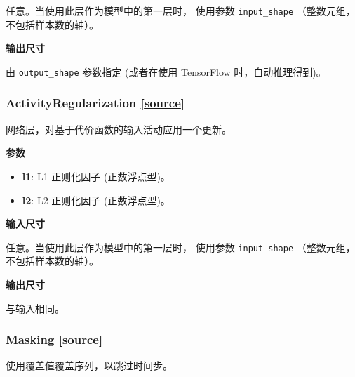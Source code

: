任意。当使用此层作为模型中的第一层时， 使用参数 \texttt{input\_shape}
（整数元组，不包括样本数的轴）。

\textbf{输出尺寸}

由 \texttt{output\_shape} 参数指定 (或者在使用 TensorFlow
时，自动推理得到)。


\subsubsection{ActivityRegularization {\href{https://github.com/keras-team/keras/blob/master/keras/layers/core.py\#L886}{{[}source{]}}}}

\begin{Shaded}
\begin{Highlighting}[]
\OperatorTok{=}\OperatorTok{=}\NormalTok{)}
\end{Highlighting}
\end{Shaded}

网络层，对基于代价函数的输入活动应用一个更新。

\textbf{参数}

\begin{itemize}
\tightlist
\item
  \textbf{l1}: L1 正则化因子 (正数浮点型)。
\item
  \textbf{l2}: L2 正则化因子 (正数浮点型)。
\end{itemize}

\textbf{输入尺寸}

任意。当使用此层作为模型中的第一层时， 使用参数 \texttt{input\_shape}
（整数元组，不包括样本数的轴）。

\textbf{输出尺寸}

与输入相同。


\subsubsection{Masking {\href{https://github.com/keras-team/keras/blob/master/keras/layers/core.py\#L28}{{[}source{]}}}}

\begin{Shaded}
\begin{Highlighting}[]
\OperatorTok{=}\NormalTok{)}
\end{Highlighting}
\end{Shaded}

使用覆盖值覆盖序列，以跳过时间步。

